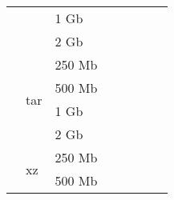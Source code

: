 \documentclass{article}           %
\begin{document}
\begin{table}[]
\begin{tabular}{lllccccc}
\multicolumn{1}{|l|}{}                               & \multicolumn{1}{l|}{}                     & \multicolumn{1}{l|}{1 Gb}   & \multicolumn{1}{c|}{}       & \multicolumn{1}{c|}{}       & \multicolumn{1}{c|}{}           & \multicolumn{1}{c|}{}      & \multicolumn{1}{c|}{}        \\ \cline{3-8} 
\multicolumn{1}{|l|}{}                               & \multicolumn{1}{l|}{}                     & \multicolumn{1}{l|}{2 Gb}   & \multicolumn{1}{c|}{}       & \multicolumn{1}{c|}{}       & \multicolumn{1}{c|}{}           & \multicolumn{1}{c|}{}      & \multicolumn{1}{c|}{}        \\ \cline{2-8} 
\multicolumn{1}{|l|}{}                               & \multicolumn{1}{l|}{\multirow{4}{*}{tar}} & \multicolumn{1}{l|}{250 Mb} & \multicolumn{1}{c|}{}       & \multicolumn{1}{c|}{}       & \multicolumn{1}{c|}{}           & \multicolumn{1}{c|}{}      & \multicolumn{1}{c|}{}        \\ \cline{3-8} 
\multicolumn{1}{|l|}{}                               & \multicolumn{1}{l|}{}                     & \multicolumn{1}{l|}{500 Mb} & \multicolumn{1}{c|}{}       & \multicolumn{1}{c|}{}       & \multicolumn{1}{c|}{}           & \multicolumn{1}{c|}{}      & \multicolumn{1}{c|}{}        \\ \cline{3-8} 
\multicolumn{1}{|l|}{}                               & \multicolumn{1}{l|}{}                     & \multicolumn{1}{l|}{1 Gb}   & \multicolumn{1}{c|}{}       & \multicolumn{1}{c|}{}       & \multicolumn{1}{c|}{}           & \multicolumn{1}{c|}{}      & \multicolumn{1}{c|}{}        \\ \cline{3-8} 
\multicolumn{1}{|l|}{}                               & \multicolumn{1}{l|}{}                     & \multicolumn{1}{l|}{2 Gb}   & \multicolumn{1}{c|}{}       & \multicolumn{1}{c|}{}       & \multicolumn{1}{c|}{}           & \multicolumn{1}{c|}{}      & \multicolumn{1}{c|}{}        \\ \cline{2-8} 
\multicolumn{1}{|l|}{}                               & \multicolumn{1}{l|}{\multirow{4}{*}{xz}}  & \multicolumn{1}{l|}{250 Mb} & \multicolumn{1}{c|}{}       & \multicolumn{1}{c|}{}       & \multicolumn{1}{c|}{}           & \multicolumn{1}{c|}{}      & \multicolumn{1}{c|}{}        \\ \cline{3-8} 
\multicolumn{1}{|l|}{}                               & \multicolumn{1}{l|}{}                     & \multicolumn{1}{l|}{500 Mb} & \multicolumn{1}{c|}{}       & \multicolumn{1}{c|}{}       & \multicolumn{1}{c|}{}           & \multicolumn{1}{c|}{}      & \multicolumn{1}{c|}{}        \\ \cline{3-8} 

\end{tabular}
\end{table}
\end{document}
